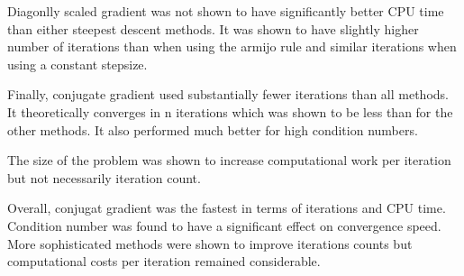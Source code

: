 \documentclass[11pt,letterpaper]{article}
\begin{document}
\begin{enumerate}
		Diagonlly scaled gradient was not shown to have significantly better CPU time than either steepest descent methods.
		It was shown to have slightly higher number of iterations than when using the armijo rule and similar iterations
		when using a constant stepsize.

		Finally, conjugate gradient used substantially fewer iterations than all methods. It theoretically converges in 
		n iterations which was shown to be less than for the other methods. It also performed much better for high
		condition numbers.

		The size of the problem was shown to increase computational work per iteration but not necessarily iteration count.
		
		Overall, conjugat gradient was the fastest in terms of iterations and CPU time.
		Condition number was found to have a significant effect on convergence speed.
		More sophisticated methods were shown to improve iterations counts but computational costs per iteration
		remained considerable.
	\end{enumerate}
\end{document}
